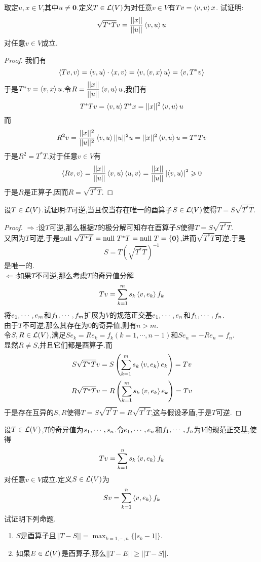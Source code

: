 \documentclass{ctexart}
\begin{document}
\begin{problem}[25.]
    取定$u,x\in V$,其中$u\neq\mathbf0$.定义$T\in\mathcal{L}(V)$为对任意$v\in V$有$Tv=\left\langle{v},{u}\right\rangle x$.%
    试证明:\[\sqrt{T^*T}v=\dfrac{||x||}{||u||}\left\langle{v},{u}\right\rangle u\]对任意$v\in V$成立.
\end{problem}
\begin{proof}
    我们有
    \[\left\langle{Tv},{v}\right\rangle=\left\langle{v},{u}\right\rangle\cdot\left\langle{x},{v}\right\rangle=\left\langle{v},{\left\langle{v},{x}\right\rangle u}\right\rangle=\left\langle{v},{T^*v}\right\rangle\]
    于是$T^*v=\left\langle{v},{x}\right\rangle u$.令$R=\dfrac{||x||}{||u||}\left\langle{v},{u}\right\rangle u$,我们有
    \[T^*Tv=\left\langle{v},{u}\right\rangle T^*x=||x||^2\left\langle{v},{u}\right\rangle u\]
    而
    \[R^2v=\dfrac{||x||^2}{||u||^2}\left\langle{v},{u}\right\rangle||u||^2u=||x||^2\left\langle{v},{u}\right\rangle u=T^*Tv\]
    于是$R^2=T^*T$.对于任意$v\in V$有
    \[\left\langle{Rv},{v}\right\rangle=\dfrac{||x||}{||u||}\left\langle{v},{u}\right\rangle\left\langle{u},{v}\right\rangle=\dfrac{||x||}{||u||}\left|\left\langle{v},{u}\right\rangle\right|^2\geqslant0\]
    于是$R$是正算子,因而$R=\sqrt{T^*T}$.
\end{proof}
\begin{problem}[26.]
    设$T\in\mathcal{L}(V)$.试证明:$T$可逆,当且仅当存在唯一的酉算子$S\in\mathcal{L}(V)$使得$T=S\sqrt{T^*T}$.
\end{problem}
\begin{proof}
    $\Rightarrow$:设$T$可逆,那么根据$T$的极分解可知存在酉算子$S$使得$T=S\sqrt{T^*T}$.\\
    又因为$T$可逆,于是$\text{null }\sqrt{T^*T}=\text{null } T^*T=\text{null } T=\{\mathbf0\}$,进而$\sqrt{T^*T}$可逆.于是
    \[S=T\left(\sqrt{T^*T}\right)^{-1}\]
    是唯一的.\\
    $\Leftarrow$:如果$T$不可逆,那么考虑$T$的奇异值分解
    \[Tv=\sum_{k=1}^{m}s_k\left\langle{v},{e_k}\right\rangle f_k\]
    将${e}_1,\cdots,{e}_{m}$和${f}_1,\cdots,{f}_{m}$扩展为$V$的规范正交基${e}_1,\cdots,{e}_{n}$和${f}_1,\cdots,{f}_{n}$.\\
    由于$T$不可逆,那么其存在为$0$的奇异值,则有$n>m$.\\
    令$S,R\in\mathcal{L}(V)$,满足$Se_k=Re_k=f_k(k=1,\cdots,n-1)$和$Se_n=-Re_n=f_n$.\\
    显然$R\neq S$,并且它们都是酉算子.而
    \[S\sqrt{T^*T}v=S\left(\sum_{k=1}^{m}s_k\left\langle{v},{e_k}\right\rangle e_k\right)=Tv\]
    \[R\sqrt{T^*T}v=R\left(\sum_{k=1}^{m}s_k\left\langle{v},{e_k}\right\rangle e_k\right)=Tv\]
    于是存在互异的$S,R$使得$T=S\sqrt{T^*T}=R\sqrt{T^*T}$,这与假设矛盾,于是$T$可逆.
\end{proof}
\begin{problem}[27.]
    设$T\in\mathcal{L}(V)$,$T$的奇异值为${s}_1,\cdots,{s}_{n}$.令${e}_1,\cdots,{e}_{n}$和${f}_1,\cdots,{f}_{n}$为$V$的规范正交基,使得
    \[Tv=\sum_{k=1}^{n}s_k\left\langle{v},{e_k}\right\rangle f_k\]
    对任意$v\in V$成立.定义$S\in\mathcal{L}(V)$为
    \[Sv=\sum_{k=1}^n\left\langle{v},{e_k}\right\rangle f_k\]
    试证明下列命题.
    \begin{enumerate}[label=\tbf{(\arabic*)}]
        \item $S$是酉算子且$\displaystyle||T-S||=\max_{k=1,\cdots,n}\{|s_k-1|\}$.
        \item 如果$E\in\mathcal{L}(V)$是酉算子,那么$||T-E||\geqslant||T-S||$.
    \end{enumerate}
\end{problem}
\end{document}
